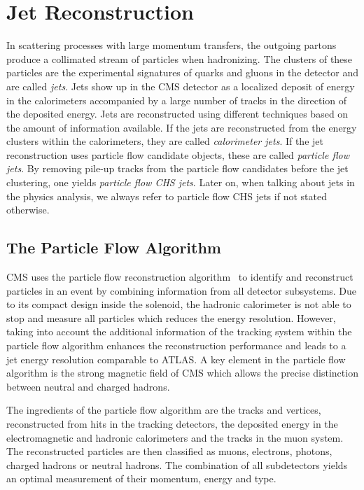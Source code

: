 
\chapter{Jet Reconstruction}
\label{chap:jet_reconstruction}

In scattering processes with large momentum transfers, the outgoing partons
produce a collimated stream of particles when hadronizing. The clusters of these
particles are the experimental signatures of quarks and gluons in the detector
and are called \emph{jets}. Jets show up in the CMS detector as a localized
deposit of energy in the calorimeters accompanied by a large number of tracks in
the direction of the deposited energy. Jets are reconstructed using different
techniques based on the amount of information available. If the jets are
reconstructed from the energy clusters within the calorimeters, they are called
\emph{calorimeter jets}. If the jet reconstruction uses particle flow candidate
objects, these are called \emph{particle flow jets}. By removing pile-up tracks
from the particle flow candidates before the jet clustering, one yields
\emph{particle flow CHS jets}. Later on, when talking about jets in the physics
analysis, we always refer to particle flow CHS jets if not stated otherwise.

\section{The Particle Flow Algorithm}
\label{sec:particle_flow_algorithm}

CMS uses the particle flow reconstruction
algorithm~\cite{CMS-PAS-PFT-09-001,CMS-PAS-PFT-10-001} to identify and
reconstruct particles in an event by combining information from all detector
subsystems. Due to its compact design inside the solenoid, the hadronic
calorimeter is not able to stop and measure all particles which reduces the
energy resolution. However, taking into account the additional information of
the tracking system within the particle flow algorithm enhances the
reconstruction performance and leads to a jet energy resolution comparable to
ATLAS. A key element in the particle flow algorithm is the strong magnetic field
of CMS which allows the precise distinction between neutral and charged hadrons. 

The ingredients of the particle flow algorithm are the
tracks and vertices, reconstructed from hits in the tracking detectors, the
deposited energy in the electromagnetic and hadronic calorimeters and the tracks
in the muon system. The reconstructed particles are then classified as muons,
electrons, photons, charged hadrons or neutral hadrons. The combination of all
subdetectors yields an optimal measurement of their momentum, energy and type.

